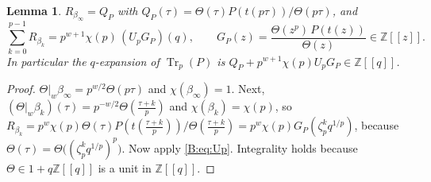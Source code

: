 \documentclass[11pt,a4paper]{article}
\newtheorem{lemma}[theorem]{Lemma}
\theoremstyle{definition}\newtheorem{definition}[theorem]{Definition}
\theoremstyle{remark}\newtheorem{remark}[theorem]{Remark}
\newcommand{\Z}{\mathbb Z}
\DeclareMathOperator{\Tr}{Tr}
\numberwithin{equation}{section}
\begin{document}
\begin{lemma}\label{B:lem:qexp}
$R_{\beta_\infty}=Q_P$ with $Q_P(\tau)=\Theta(\tau)P(t(p\tau))/\Theta(p\tau)$, and
\[
\sum_{k=0}^{p-1}R_{\beta_k}=p^{w+1}\chi(p)\,(U_pG_P)(q),\qquad
G_P(z)=\frac{\Theta(z^p)\,P(t(z))}{\Theta(z)}\in\Z[[z]].
\]
In particular the $q$-expansion of $\Tr_p(P)$ is $Q_P+p^{w+1}\chi(p)U_pG_P\in\Z[[q]]$.
\end{lemma}
\begin{proof}
$\Theta|_w\beta_\infty=p^{w/2}\Theta(p\tau)$ and $\chi(\beta_\infty)=1$. Next,
$(\Theta|_w\beta_k)(\tau)=p^{-w/2}\Theta(\frac{\tau+k}p)$ and $\chi(\beta_k)=\chi(p)$, so
$R_{\beta_k}=p^w\chi(p)\Theta(\tau)P(t(\frac{\tau+k}p))/\Theta(\frac{\tau+k}p)=p^w\chi(p)G_P(\zeta_p^kq^{1/p})$,
because $\Theta(\tau)=\Theta\bigl((\zeta_p^kq^{1/p})^p\bigr)$. Now apply \eqref{B:eq:Up}. Integrality
holds because $\Theta\in1+q\Z[[q]]$ is a unit in $\Z[[q]]$.
\end{proof}
\end{document}

